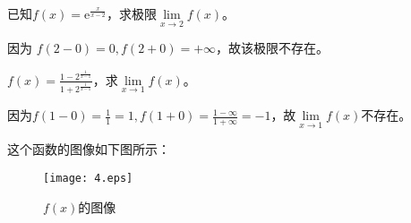         \begin{example}
            已知$ f(x)=\mathrm{e}^{\frac{x}{x-2}}$，求极限$\lim\limits_{x \to 2}f(x)$。
        \end{example}

        \begin{solution}
            因为 $f(2-0)=0 , f(2+0)=+\infty$，故该极限不存在。
        \end{solution}

        \begin{example}
            $f(x)=\displaystyle\frac{1-2^{\frac{1}{x-1}}}{1+2^{\frac{1}{x-1}}}$，求$\lim\limits_{x \to 1}f(x)$。
        \end{example}

        \begin{solution}
            因为$f(1-0)=\displaystyle\frac{1}{1}=1, f(1+0)=\displaystyle\frac{1-\infty}{1+\infty}=-1$，故$\lim\limits_{x \to 1}f(x)$不存在。
        \end{solution}
        这个函数的图像如下图所示：
        \begin{figure}[htbp]
            \centering
            \texttt{[image: 4.eps]}
            \caption{$f(x)$的图像}
          \end{figure}

   